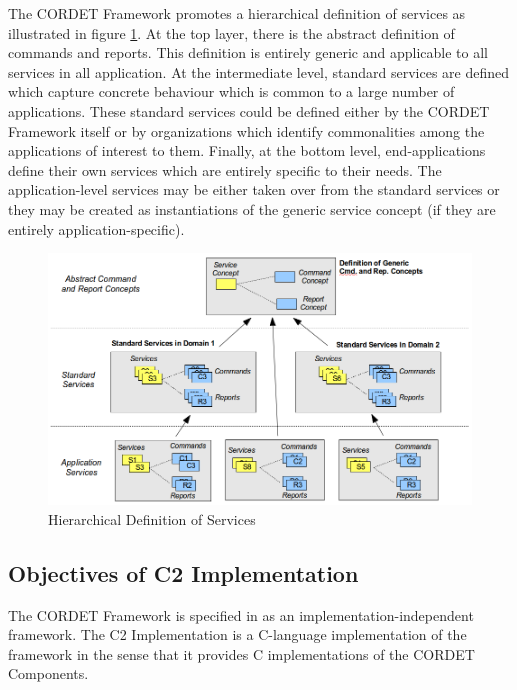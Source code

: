 \documentclass[a4paper,10pt]{article}
\begin{document}
The CORDET Framework promotes a hierarchical definition of services as illustrated in figure \ref{fig:HierarchicalDefServ}. 
At the top layer, there is the abstract definition of commands and reports. 
This definition is entirely generic and applicable to all services in all application. 
At the intermediate level, standard services are defined which capture concrete behaviour which is common to a large number of applications. 
These standard services could be defined either by the CORDET Framework itself or by organizations which identify commonalities among the applications of interest to them. 
Finally, at the bottom level, end-applications define their own services which are entirely specific to their needs. 
The application-level services may be either taken over from the standard services or they may be created as instantiations of the generic service concept (if they are entirely application-specific).

\begin{figure}[ht]
 \centering
 \includegraphics[scale=0.3,keepaspectratio=true]{HierarchicalDefServ.png}
 \caption{Hierarchical Definition of Services}
 \label{fig:HierarchicalDefServ}
\end{figure}

\subsection{Objectives of C2 Implementation}\label{sec:ObjectivesC2Impl} 

The CORDET Framework is specified in \cite{ref:cordetfw} as an implementation-independent framework.
The C2 Implementation is a C-language implementation of the framework in the sense that it provides C implementations of the CORDET Components.
\end{document}
